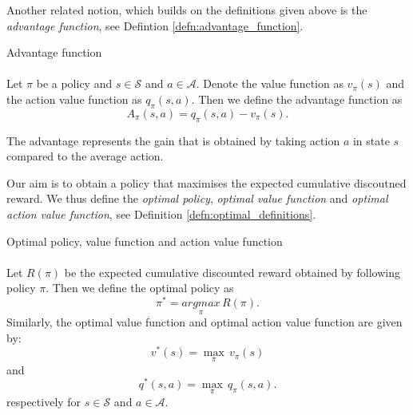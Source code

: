 Another related notion, which builds on the definitions given above is the \textit{advantage function}, see Defintion \ref{defn:advantage_function}.
\begin{defn}{Advantage function} \label{defn:advantage_function}
\\
\cite[Section 3]{a3c_paper}
\\
Let $\pi$ be a policy and $s \in \mathcal{S}$ and $a \in \mathcal{A}$. Denote the value function as $v_{\pi}(s)$ and the action value function as $q_{\pi}(s,a)$. Then we define the advantage function  as
\begin{equation*}
 A_{\pi}(s,a) = q_{\pi}(s,a) - v_{\pi}(s).
\end{equation*}
\end{defn}
The advantage represents the gain that is obtained by taking action $a$ in state $s$ compared to the average action.

Our aim is to obtain a policy that maximises the expected cumulative discoutned reward. We thus define the \textit{optimal policy}, \textit{optimal value function} and \textit{optimal action value function}, see Definition \ref{defn:optimal_definitions}.

\begin{defn}{Optimal policy, value function and action value function} 
\label{defn:optimal_definitions} 
\\
\cite[Section 3.6]{sutton2018reinforcement}
\\
Let $R(\pi)$ be the expected cumulative discounted reward obtained by following policy $\pi$. Then we define the optimal policy as
\begin{equation*}
 	\pi^* = \underset{\pi}{argmax} \, R(\pi).
\end{equation*}
Similarly, the optimal value function and optimal action value function are given by: 
\begin{equation*}
 	v^*(s) = \underset{\pi}{\max} \, v_{\pi}(s)
\end{equation*}
and
\begin{equation*}
 	q^*(s,a) = \underset{\pi}{\max} \, q_{\pi}(s,a).
\end{equation*}
respectively for $s \in \mathcal{S}$ and $a \in \mathcal{A}$.
\end{defn}

